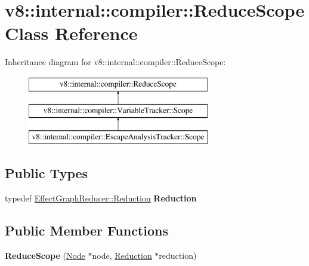 \hypertarget{classv8_1_1internal_1_1compiler_1_1ReduceScope}{}\section{v8\+:\+:internal\+:\+:compiler\+:\+:Reduce\+Scope Class Reference}
\label{classv8_1_1internal_1_1compiler_1_1ReduceScope}
Inheritance diagram for v8\+:\+:internal\+:\+:compiler\+:\+:Reduce\+Scope\+:\begin{figure}[H]
\begin{center}
\leavevmode
\includegraphics[height=3.000000cm]{classv8_1_1internal_1_1compiler_1_1ReduceScope}
\end{center}
\end{figure}
\subsection*{Public Types}
\begin{DoxyCompactItemize}
\item 
\mbox{\label{classv8_1_1internal_1_1compiler_1_1ReduceScope_a468cbd2610c518e5a50ba290ec557b71}} 
typedef \mbox{\hyperlink{classv8_1_1internal_1_1compiler_1_1EffectGraphReducer_1_1Reduction}{Effect\+Graph\+Reducer\+::\+Reduction}} {\bfseries Reduction}
\end{DoxyCompactItemize}
\subsection*{Public Member Functions}
\begin{DoxyCompactItemize}
\item 
\mbox{\label{classv8_1_1internal_1_1compiler_1_1ReduceScope_a3db123550d78e91ac05faf95d71eea4c}} 
{\bfseries Reduce\+Scope} (\mbox{\hyperlink{classv8_1_1internal_1_1compiler_1_1Node}{Node}} $\ast$node, \mbox{\hyperlink{classv8_1_1internal_1_1compiler_1_1EffectGraphReducer_1_1Reduction}{Reduction}} $\ast$reduction)
\end{DoxyCompactItemize}
